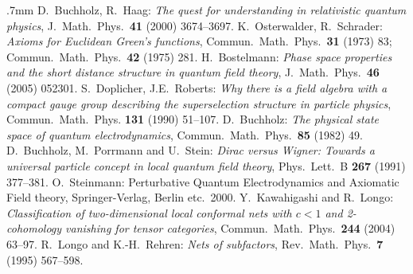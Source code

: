 \documentclass[multphys,vecphys]{svmult}
\begin{document}
\begin{thebibliography}{99}
%
\itemsep.7mm
 D.~Buchholz, R.~Haag: 
{\it The quest for understanding in relativistic quantum physics}, 
J.\ Math.\ Phys.\ {\bf 41} (2000) 3674--3697. 
%
 K.~Osterwalder, R.~Schrader: 
{\it Axioms for Euclidean Green's functions}, 
Commun.\ Math.\ Phys.\ {\bf 31} (1973) 83; 
Commun.\ Math.\ Phys.\ {\bf 42} (1975) 281. 
%
 H.~Bostelmann: 
{\it Phase space properties and the short distance structure in
  quantum field theory}, 
J.\ Math.\ Phys.\ {\bf 46} (2005) 052301. 
%
 S.~Doplicher, J.E.~Roberts: {\it Why there is a field
  algebra with a compact gauge group describing the superselection
  structure in particle physics}, Commun.\ Math.\ Phys. {\bf 131} 
  (1990) 51--107. 
%
 D.~Buchholz: 
{\it The physical state space of quantum electrodynamics}, 
Commun.\ Math.\ Phys.\ {\bf 85} (1982) 49. 
%
 D.~Buchholz, M.~Porrmann and U.~Stein:
{\it Dirac versus Wigner: Towards a universal particle concept in
  local quantum field theory}, Phys.\ Lett.\ B {\bf 267} (1991) 377--381.
%
 O.~Steinmann: 
Perturbative Quantum Electrodynamics and Axiomatic Field theory,  
Springer-Verlag, Berlin etc.\ 2000.
%
 Y.~Kawahigashi and R.~Longo: 
{\it  Classification of two-dimensional local conformal nets with 
$c<1$ and 2-cohomology vanishing for tensor categories},
Commun.\ Math.\ Phys.\  {\bf 244} (2004) 63--97.
%
  R.~Longo and K.-H.~Rehren: {\it Nets of subfactors}, Rev.\ Math.\
  Phys.\  {\bf 7} (1995) 567--598.


\end{thebibliography}
\end{document}
